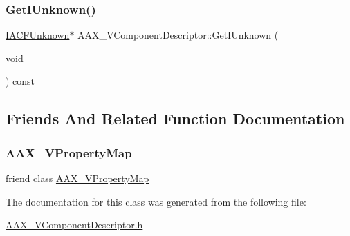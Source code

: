 \subsubsection{\texorpdfstring{GetIUnknown()}{GetIUnknown()}}
{\footnotesize\ttfamily \mbox{\hyperlink{a01409}{I\+A\+C\+F\+Unknown}}$\ast$ A\+A\+X\+\_\+\+V\+Component\+Descriptor\+::\+Get\+I\+Unknown (\begin{DoxyParamCaption}\item[{void}]{ }\end{DoxyParamCaption}) const}



\subsection{Friends And Related Function Documentation}
\mbox{\label{a01901_a4e23888818817a675e86dd4e71bd1ab1}} 
\subsubsection{\texorpdfstring{AAX\_VPropertyMap}{AAX\_VPropertyMap}}
{\footnotesize\ttfamily friend class \mbox{\hyperlink{a01937}{A\+A\+X\+\_\+\+V\+Property\+Map}}\hspace{0.3cm}{\ttfamily [friend]}}



The documentation for this class was generated from the following file\+:\begin{DoxyCompactItemize}
\item 
\mbox{\hyperlink{a00695}{A\+A\+X\+\_\+\+V\+Component\+Descriptor.\+h}}\end{DoxyCompactItemize}
